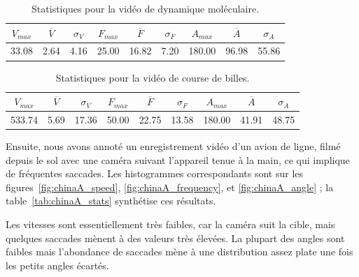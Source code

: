 \begin{table}
	\centering
	\begin{tabular}{c c c c c c c c c}
		$V_{max}$	& $\overline{V}$	& $\sigma_{V}$	& $F_{max}$	& $\overline{F}$	& $\sigma_{F}$	& $A_{max}$	& $\overline{A}$	& $\sigma_{A}$	\bigstrut[b] \\ \hline

		33.08		& 2.64				& 4.16			& 25.00		& 16.82				& 7.20			& 180.00	& 96.98				& 55.86			\bigstrut[t] \\
	\end{tabular}
	\caption[Statistiques pour la vidéo de dynamique moléculaire]{Statistiques pour la vidéo de dynamique moléculaire.}
	\label{tab:atom_stats}
\end{table}

\begin{table}
	\centering
	\begin{tabular}{c c c c c c c c c}
		$V_{max}$	& $\overline{V}$	& $\sigma_{V}$	& $F_{max}$	& $\overline{F}$	& $\sigma_{F}$	& $A_{max}$	& $\overline{A}$	& $\sigma_{A}$	\bigstrut[b] \\ \hline

		533.74		& 5.69				& 17.36			& 50.00		& 22.75				& 13.58			& 180.00	& 41.91				& 48.75			\bigstrut[t] \\
	\end{tabular}
	\caption[Statistiques pour la vidéo de course de billes]{Statistiques pour la vidéo de course de billes.}
	\label{tab:bille_stats}
\end{table}

	Ensuite, nous avons annoté un enregistrement vidéo d'un avion de ligne, filmé depuis le sol avec une caméra suivant l'appareil tenue à la main, ce qui implique de fréquentes saccades. Les histogrammes correspondants sont sur les figures~\ref{fig:chinaA_speed}, \ref{fig:chinaA_frequency}, et \ref{fig:chinaA_angle} ; la table~\ref{tab:chinaA_stats} synthétise ces résultats.
	
	Les vitesses sont essentiellement très faibles, car la caméra suit la cible, mais quelques saccades mènent à des valeurs très élevées. La plupart des angles sont faibles mais l'abondance de saccades mène à une distribution assez \og plate \fg{} une fois les petits angles écartés.

